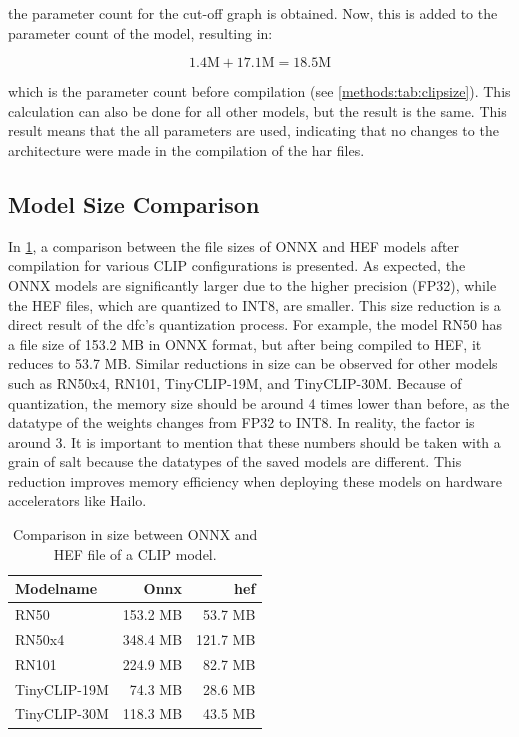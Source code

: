 the parameter count for the cut-off graph is obtained. Now, this is added to the parameter count of the model, resulting in:

\begin{equation*}
    1.4 \text{M} + 17.1 \text{M} = 18.5 \text{M} 
\end{equation*}

which is the parameter count before compilation (see \cref{methods:tab:clipsize}).
This calculation can also be done for all other models, but the result is the same.
This result means that the all parameters are used, indicating that no changes to the architecture were made in the compilation of the \acrshort{har} files.


\subsection{Model Size Comparison}

In \cref{methods:tab:sizecompare}, a comparison between the file sizes of ONNX and HEF models after compilation for various CLIP configurations is presented.
As expected, the ONNX models are significantly larger due to the higher precision (FP32), while the HEF files, which are quantized to INT8, are smaller.
This size reduction is a direct result of the \acrshort{dfc}'s quantization process.
For example, the model RN50 has a file size of 153.2 MB in ONNX format, but after being compiled to HEF, it reduces to 53.7 MB.
Similar reductions in size can be observed for other models such as RN50x4, RN101, TinyCLIP-19M, and TinyCLIP-30M.
Because of quantization, the memory size should be around 4 times lower than before, as the datatype of the weights changes from FP32 to INT8.
In reality, the factor is around 3.
It is important to mention that these numbers should be taken with a grain of salt because the datatypes of the saved models are different.
This reduction improves memory efficiency when deploying these models on hardware accelerators like Hailo.

\begin{table}
    \centering
    \begin{tabular}{l|rr}
    \hline
    Modelname & Onnx & \acrshort{hef}\\\hline
    RN50 & 153.2 MB & 53.7 MB \\ 
    RN50x4 & 348.4 MB & 121.7 MB  \\ 
    RN101 & 224.9 MB  & 82.7 MB \\
    TinyCLIP-19M & 74.3 MB & 28.6 MB  \\ 
    TinyCLIP-30M & 118.3 MB & 43.5 MB  \\ 
    \end{tabular}
    \caption{Comparison in size between ONNX and HEF file of a CLIP model.}
    \label{methods:tab:sizecompare}
\end{table}

